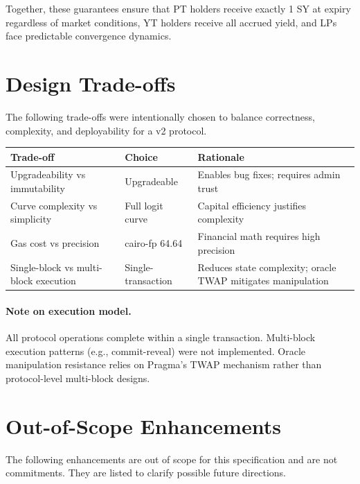 Together, these guarantees ensure that PT holders receive exactly 1 SY at expiry regardless of market conditions, YT holders receive all accrued yield, and LPs face predictable convergence dynamics.


\section{Design Trade-offs}

The following trade-offs were intentionally chosen to balance correctness, complexity, and deployability for a v2 protocol.

\begin{center}
\begin{tabularx}{\textwidth}{l l >{\raggedright\arraybackslash}X}
\toprule
\textbf{Trade-off} & \textbf{Choice} & \textbf{Rationale} \\
\midrule
Upgradeability vs immutability & Upgradeable & Enables bug fixes; requires admin trust \\
Curve complexity vs simplicity & Full logit curve & Capital efficiency justifies complexity \\
Gas cost vs precision & cairo-fp 64.64 & Financial math requires high precision \\
Single-block vs multi-block execution & Single-transaction & Reduces state complexity; oracle TWAP mitigates manipulation \\
\bottomrule
\end{tabularx}
\end{center}

\paragraph{Note on execution model.}
All protocol operations complete within a single transaction. Multi-block execution patterns (e.g., commit-reveal) were not implemented. Oracle manipulation resistance relies on Pragma's TWAP mechanism rather than protocol-level multi-block designs.


\section{Out-of-Scope Enhancements}

The following enhancements are out of scope for this specification and are not commitments. They are listed to clarify possible future directions.

